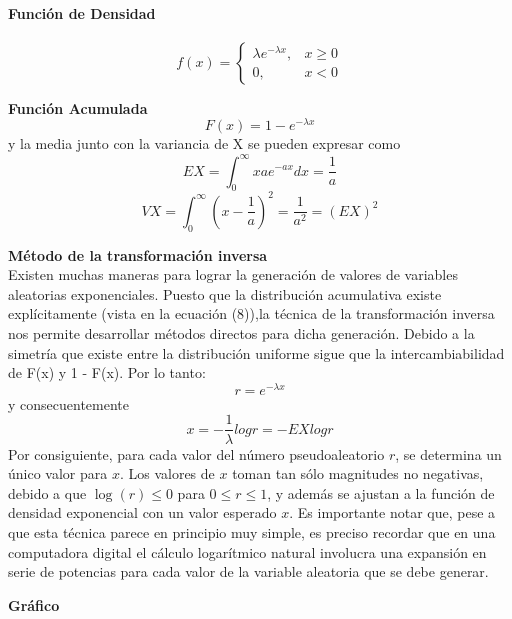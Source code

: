\documentclass[11pt]{article}
\begin{document}
\paragraph*{Función de Densidad\newline}
\[
f(x) = 
\begin{cases}
\lambda e^{-\lambda x}, & x \geq 0 \\
0, & x < 0
\end{cases}
\]

\noindent\textbf{Función Acumulada}\\
\[
F(x) = 1 - e^{-\lambda x}
\]
y la media junto con la variancia de X se pueden expresar como
  \begin{equation}
    EX = \int_{0}^{\infty} xae^{-ax}dx = \frac{1}{a}
  \end{equation}
  \begin{equation}
  VX = \int_{0}^{\infty} (x-\frac{1}{a})^2 = \frac{1}{a^2} = (EX)^2
\end{equation}
  
\noindent\textbf{Método de la transformación inversa}\\

Existen muchas maneras para lograr la generación de valores de variables aleatorias exponenciales. Puesto que la distribución acumulativa existe explícitamente (vista en la ecuación (8)),la técnica de la transformación inversa nos permite desarrollar métodos directos para dicha generación.
Debido a la simetría que existe entre la distribución uniforme sigue que la intercambiabilidad de F(x) y 1 - F(x). Por lo tanto:
\begin{equation}
r = e^{-\lambda x}
\end{equation}
y consecuentemente
\begin{equation}
x = -\frac{1}{\lambda}log r  = - EXlog r
\end{equation}
Por consiguiente, para cada valor del número pseudoaleatorio \( r \), se determina un único valor para \( x \). Los valores de \( x \) toman tan sólo magnitudes no negativas, debido a que \( \log(r) \leq 0 \) para \( 0 \leq r \leq 1 \), y además se ajustan a la función de densidad exponencial con un valor esperado \( x \). Es importante notar que, pese a que esta técnica parece en principio muy simple, es preciso recordar que en una computadora digital el cálculo logarítmico natural involucra una expansión en serie de potencias para cada valor de la variable aleatoria que se debe generar.

\newpage
\noindent\textbf{Gráfico}
\end{document}
